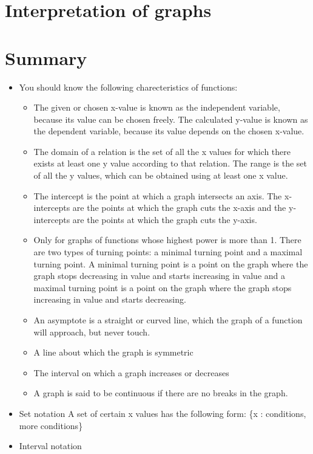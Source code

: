 \section{Interpretation of graphs}
\section{ Summary}
\nopagebreak
\label{m39348*eip-408}\begin{itemize}[noitemsep]
\item You should know the following charecteristics of functions: \label{m39348*id69342}\begin{itemize}[noitemsep]
\item The given or chosen x-value is known as the independent variable, because its value can be chosen freely. The calculated y-value is known as the dependent variable, because its value depends on the chosen x-value.\item The domain of a relation is the set of all the x values for which there exists at least one y value according to that relation. The range is the set of all the y values, which can be obtained using at least one x value.\item The intercept is the point at which a graph intersects an axis. The x-intercepts are the points at which the graph cuts the x-axis and the y-intercepts are the points at which the graph cuts the y-axis. \item Only for graphs of functions whose highest power is more than 1. There are two types of turning points: a minimal turning point and a maximal turning point. A minimal turning point is a point on the graph where the graph stops decreasing in value and starts increasing in value and a maximal turning point is a point on the graph where the graph stops increasing in value and starts decreasing. \item An asymptote is a straight or curved line, which the graph of a function will approach, but never touch.\item A line about which the graph is symmetric\item  The interval on which a graph increases or decreases\item A graph is said to be continuous if there are no breaks in the graph. \end{itemize}
\item 
Set notation
A set of certain x values has the following form: \{x : conditions, more conditions\}\item 
Interval notation

\end{itemize}
